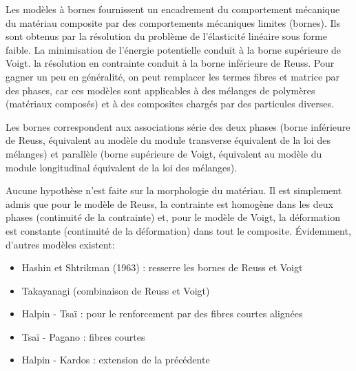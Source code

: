 \medskipvm
Les modèles à bornes fournissent un encadrement du comportement mécanique du matériau composite
par des comportements mécaniques limites (bornes).
Ils sont obtenus par la résolution du problème de l'élasticité linéaire sous forme faible.
La minimisation de l'énergie potentielle conduit à la borne supérieure de Voigt.
la résolution en contrainte conduit à la borne inférieure de Reuss.
\medskipvm
Pour gagner un peu en généralité, on peut remplacer les termes fibres et matrice par des phases,
car ces modèles sont applicables à des mélanges de polymères (matériaux composés)
et à des composites chargés par des particules diverses.

Les bornes correspondent aux associations série des deux phases (borne inférieure de Reuss,
équivalent au modèle  du module transverse équivalent de la loi des mélanges) et parallèle
(borne supérieure de Voigt, équivalent au modèle  du module longitudinal équivalent de la loi des mélanges).

Aucune hypothèse n'est faite sur la morphologie du matériau.
Il est simplement admis que pour le modèle de Reuss, la contrainte est homogène dans les deux
phases (continuité de la contrainte) et, pour le modèle de Voigt,
la déformation est constante  (continuité de la déformation) dans tout le composite.
\medskipvm
Évidemment, d'autres modèles existent:
\begin{itemize}
	\item Hashin et Shtrikman (1963) : resserre les bornes de Reuss et Voigt
	\item Takayanagi (combinaison de Reuss et Voigt)
	\item Halpin - Tsaï : pour le renforcement par des fibres courtes alignées
	\item Tsaï - Pagano : fibres courtes
	\item Halpin - Kardos : extension de la précédente
\end{itemize}

\medskip
